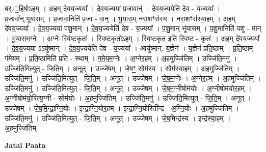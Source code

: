 \documentclass[17pt]{extarticle}
\begin{document}
ब॒र्.॒हिषो॒ऽहम् । अ॒हम् दे॑वय॒ज्यया᳚ । दे॒व॒य॒ज्यया᳚ प्र॒जावान्॑ । दे॒व॒य॒ज्ययेति॑ देव - य॒ज्यया᳚ । प्र॒जावा᳚न्,भूयासम् । प्र॒जावा॒निति॑ प्र॒जा - वा॒न्॒ । भू॒या॒स॒म् नरा॒शꣳस॑स्य । नरा॒शꣳस॑स्या॒हम् । अ॒हम् दे॑वय॒ज्यया᳚ । दे॒व॒य॒ज्यया॑ पशु॒मान् । दे॒व॒य॒ज्ययेति॑ देव - य॒ज्यया᳚ । प॒शु॒मान् भू॑यासम् । प॒शु॒मानिति॑ पशु - मान् । भू॒या॒स॒म॒ग्नेः । अ॒ग्नेः स्वि॑ष्ट॒कृतः॑ । स्वि॒ष्ट॒कृतो॒ऽहम् । स्वि॒ष्ट॒कृत॒ इति॑ स्विष्ट - कृतः॑ । अ॒हम् दे॑वय॒ज्यया᳚ । दे॒व॒य॒ज्यया ऽऽयु॑ष्मान् । दे॒व॒य॒ज्ययेति॑ देव - य॒ज्यया᳚ । आयु॑ष्मान्. य॒ज्ञेन॑ । य॒ज्ञेन॑ प्रति॒ष्ठाम् । प्र॒ति॒ष्ठाम् ग॑मेयम् । प्र॒ति॒ष्ठामिति॑ प्रति - स्थाम् । ग॒मे॒य॒म॒ग्नेः । अ॒ग्नेर॒हम् । अ॒हमुज्जि॑तिम् । उज्जि॑ति॒मनु॑ । उज्जि॑ति॒मित्युत् - जि॒ति॒म् । अनूत् । उज्जे॑षम् । जे॒षꣳ॒॒ सोम॑स्य । सोम॑स्या॒हम् । अ॒हमुज्जि॑तिम् । उज्जि॑ति॒मनु॑ । उज्जि॑ति॒मित्युत् - जि॒ति॒म् । अनूत् । उज्जे॑षम् । जे॒ष॒म॒ग्नेः । अ॒ग्नेर॒हम् । अ॒हमुज्जि॑तिम् । उज्जि॑ति॒मनु॑ । उज्जि॑ति॒मित्युत् - जि॒ति॒म् । अनूत् । उज्जे॑षम् । जे॒ष॒म॒ग्नीषोम॑योः । अ॒ग्नीषोम॑योर॒हम् । अ॒ग्नीषोम॑यो॒रित्य॒ग्नी - सोम॑योः । अ॒हमुज्जि॑तिम् । उज्जि॑ति॒मनु॑ । उज्जि॑ति॒मित्युत् - जि॒ति॒म् । अनूत् । उज्जे॑षम् । जे॒ष॒मि॒न्द्रा॒ग्नि॒योः । इ॒न्द्रा॒ग्नि॒योर॒हम् । इ॒न्द्रा॒ग्नि॒योरिती᳚न्द्र - अ॒ग्नि॒योः । अ॒हमुज्जि॑तिम् । उज्जि॑ति॒मनु॑ । उज्जि॑ति॒मित्युत् - जि॒ति॒म् । अनूत् । उज्जे॑षम् । जे॒ष॒मिन्द्र॑स्य । इन्द्र॑स्या॒हम् । अ॒हमुज्जि॑तिम् \newline

\textbf{Jatai Paata} \newline
\end{document}
